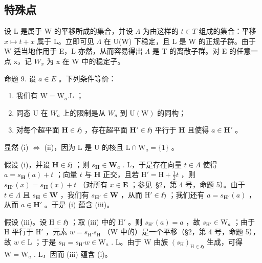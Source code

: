 \subsection{特殊点}

设 L 是属于 W 的平移所成的集合，并设 \(\Lambda\) 为由这样的 \(t \in T\) 组成的集合：平移 \(x \mapsto t + x\) 属于 L。立即可见 \(\Lambda\) 在 U(W) 下稳定，且 L 是 W 的正规子群。由于 W 适当地作用于 E，L 亦然，从而容易得出 \(\Lambda\) 是 T 的离散子群。对 E 的任意一点 x，记 \(W_x\) 为 x 在 W 中的稳定子。

命题 9. 设 \(a \in E\) 。下列条件等价：

\begin{enumerate}
\def\labelenumi{(\roman{enumi})}
\item
  我们有 \(\mathrm{W} = \mathrm{W}_{a}.\mathrm{L}\) ；
\item
  同态 U 在 \(W_{a}\) 上的限制是从 \(W_{a}\) 到 \(\mathrm{U}(\mathrm{W})\) 的同构；
\item
  对每个超平面 \(\mathbf{H} \in \mathfrak{H}\) ，存在超平面 \(\mathbf{H}' \in \mathfrak{H}\) 平行于 \(\mathbf{H}\) 且使得 \(a \in \mathbf{H}'\) 。
\end{enumerate}

显然 (i) \(\Leftrightarrow\) (ii)，因为 L 是 U 的核且 \(\mathrm{L} \cap \mathrm{W}_a = \{1\}\) 。

假设 (i)，并设 \(\mathbf{H} \in \mathfrak{H}\) ；则 \(s_{\mathbf{H}} \in \mathbf{W}_a\) . L，于是存在向量 \(t \in \Lambda\) 使得 \(a = s_{\mathbf{H}}(a) + t\) ；向量 \(t\) 与 \(\mathbf{H}\) 正交，且若 \(\mathrm{H}' = \mathrm{H} + \frac{1}{2} t\) ，则 \(s_{\mathbf{H}'}(x) = s_{\mathbf{H}}(x) + t\) （对所有 \(x \in \mathbf{E}\) ；参见~§2，第 4 号，命题 5）。由于 \(t \in \Lambda\) 且 \(s_{\mathbf{H}} \in \mathbf{W}\) ，我们有 \(s_{\mathbf{H}'} \in \mathbf{W}\) ，从而 \(\mathrm{H}' \in \mathfrak{H}\) ；我们还有 \(a = s_{\mathbf{H}'}(a)\) ，从而 \(a \in \mathbf{H}'\) 。于是 (i) 蕴含 (iii)。

假设 (iii)。设 \(\mathrm{H} \in \mathfrak{H}\) ；取 (iii) 中的 \(\mathrm{H}'\) 。则 \(s_{\mathrm{H}'}(a) = a\) ，故 \(s_{\mathrm{H}'} \in \mathrm{W}_a\) ；由于 \(\mathrm{H}\) 平行于 \(\mathrm{H}'\) ，元素 \(w = s_{\mathrm{H}'} s_{\mathrm{H}}\) （\(\mathrm{W}\) 中的）是一个平移（§2，第 4 号，命题 5），故 \(w \in \mathrm{L}\) ；于是 \(s_{\mathrm{H}} = s_{\mathrm{H}'} w \in \mathrm{W}_a\) . L。由于 \(\mathrm{W}\) 由族 \((s_{\mathrm{H}})_{\mathrm{H} \in \mathfrak{H}}\) 生成，可得 \(\mathrm{W} = \mathrm{W}_a\) . L，因而 (iii) 蕴含 (i)。


